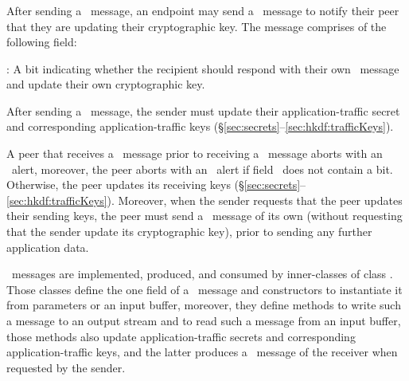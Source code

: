 \subsubsection{\KeyUpdate}

After sending a \Finished\ message, an endpoint may send a \KeyUpdate\ message
to notify their peer that they are updating their cryptographic key. The message 
comprises of the following field:

\begin{description}

\item \TLSrequestUpdate: A bit indicating whether the recipient should 
  respond with their own \KeyUpdate\ message and update their own cryptographic
  key.

\end{description}

\noindent
After sending a \KeyUpdate\ message, the sender must update their application-traffic 
secret and corresponding application-traffic keys (\S\ref{sec:secrets}--\ref{sec:hkdf:trafficKeys}).

A peer that receives a \KeyUpdate\ message prior to receiving a \Finished\ 
message aborts with an \TLSunexpectedMessage\ alert, moreover, the peer 
aborts with an \TLSillegalParameter\ alert if field \TLSrequestUpdate\ does not
contain a bit. Otherwise, the peer updates its receiving keys
(\S\ref{sec:secrets}--\ref{sec:hkdf:trafficKeys}). Moreover, when the sender
requests that the peer updates their sending keys, the peer must send a
\KeyUpdate\ message of its own (without requesting that the sender update 
its cryptographic key), prior to sending any further application data.

\begin{tcolorbox}
\KeyUpdate\ messages are implemented, produced, and consumed by inner-classes of 
class \code{KeyUpdate}. Those classes define the one field of a \NewSessionTicket\ 
message and constructors to instantiate it from parameters or an input buffer, moreover,
they define methods to write such a message to an output stream and to read such a message 
from an input buffer, those methods also update application-traffic secrets and 
corresponding application-traffic keys, and the latter produces a \KeyUpdate\ message
of the receiver when requested by the sender.
\end{tcolorbox}



